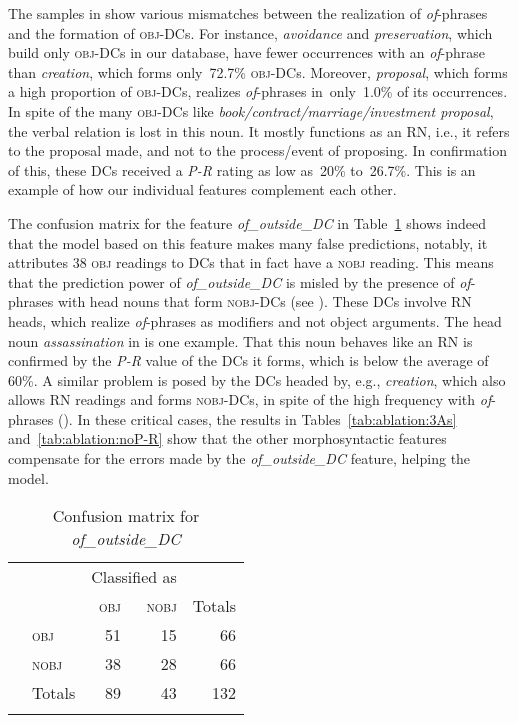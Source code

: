 \documentclass[output=paper]{langsci/langscibook}
\begin{document}
The samples  in  show various mismatches between the realization of \textit{of}-phrases and the formation of \textsc{obj}-DCs. For instance, \textit{avoidance} and \textit{preservation}, which build only \textsc{obj}-DCs in our database, have fewer occurrences with an \textit{of}-phrase than \textit{creation}, which forms only~72.7\% \textsc{obj}-DCs. Moreover, \textit{proposal}, which forms a high proportion of \textsc{obj}-DCs, realizes \textit{of}-phrases  in~only~1.0\% of its occurrences. In spite of the many \textsc{obj}-DCs like  \textit{book\slash contract\slash marriage\slash investment proposal}, the verbal relation is lost in this noun. It mostly functions as an RN, i.e., it refers to the proposal made, and not to the process\slash event of proposing. In confirmation of this, these DCs received a \textit{P-R} rating as low as~20\% to~26.7\%.
This is an example of how our individual features complement each other. 

The confusion matrix for the feature \textit{of\_outside\_DC} in Table~\ref{tab:conf:of-outside} shows indeed that the model based on this feature makes many false predictions, notably, it attributes 38 \textsc{obj} readings to DCs that in fact have a \textsc{nobj} reading. This means that the prediction power of \textit{of\_outside\_DC} is misled by the presence of \textit{of}-phrases with head nouns that form \textsc{nobj}-DCs (see ). These DCs involve RN heads, which realize \textit{of}-phrases as modifiers and not object arguments. The head noun \textit{assassination} in  is one example. That this noun behaves like an RN is confirmed by the \textit{P-R} value of the DCs it forms, which is below the average of 60\%. A similar problem is posed by the DCs headed by, e.g., \textit{creation}, which also allows RN readings and forms \textsc{nobj}-DCs, in spite of the high frequency with \textit{of}-phrases (). In these critical cases, the results in Tables~\ref{tab:ablation:3As} and~\ref{tab:ablation:noP-R} show that the other morphosyntactic features compensate for the errors made by the \textit{of\_outside\_DC} feature, helping the model.


\begin{table}
\caption{\label{tab:conf:of-outside}Confusion matrix for \textit{of\_outside\_DC}}
\begin{tabular}{llrrr}
\lsptoprule
& & \multicolumn{2}{c}{Classified as}\\
\cmidrule(lr){3-4}
&&  \textsc{obj}&\textsc{nobj}&Totals \\   
\parbox[t]{2mm}{} & \textsc{obj} &51 &15&66 \\
& \textsc{nobj}&38 & 28&66  \\
&Totals&89 &43&132\\
\lspbottomrule
\end{tabular}
\end{table}
\end{document}
